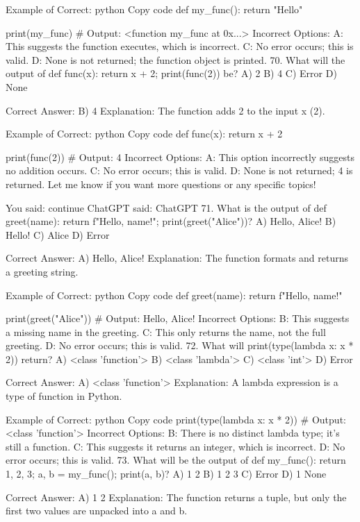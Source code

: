 Example of Correct:
python
Copy code
def my_func():
    return "Hello"

print(my_func)  # Output: <function my_func at 0x...>
Incorrect Options:
A: This suggests the function executes, which is incorrect.
C: No error occurs; this is valid.
D: None is not returned; the function object is printed.
70. What will the output of def func(x): return x + 2; print(func(2)) be?
A) 2
B) 4
C) Error
D) None

Correct Answer: B) 4
Explanation: The function adds 2 to the input x (2).

Example of Correct:
python
Copy code
def func(x):
    return x + 2

print(func(2))  # Output: 4
Incorrect Options:
A: This option incorrectly suggests no addition occurs.
C: No error occurs; this is valid.
D: None is not returned; 4 is returned.
Let me know if you want more questions or any specific topics!






You said:
continue
ChatGPT said:
ChatGPT
71. What is the output of def greet(name): return f"Hello, {name}!"; print(greet("Alice"))?
A) Hello, Alice!
B) Hello!
C) Alice
D) Error

Correct Answer: A) Hello, Alice!
Explanation: The function formats and returns a greeting string.

Example of Correct:
python
Copy code
def greet(name):
    return f"Hello, {name}!"

print(greet("Alice"))  # Output: Hello, Alice!
Incorrect Options:
B: This suggests a missing name in the greeting.
C: This only returns the name, not the full greeting.
D: No error occurs; this is valid.
72. What will print(type(lambda x: x * 2)) return?
A) <class 'function'>
B) <class 'lambda'>
C) <class 'int'>
D) Error

Correct Answer: A) <class 'function'>
Explanation: A lambda expression is a type of function in Python.

Example of Correct:
python
Copy code
print(type(lambda x: x * 2))  # Output: <class 'function'>
Incorrect Options:
B: There is no distinct lambda type; it's still a function.
C: This suggests it returns an integer, which is incorrect.
D: No error occurs; this is valid.
73. What will be the output of def my_func(): return 1, 2, 3; a, b = my_func(); print(a, b)?
A) 1 2
B) 1 2 3
C) Error
D) 1 None

Correct Answer: A) 1 2
Explanation: The function returns a tuple, but only the first two values are unpacked into a and b.

